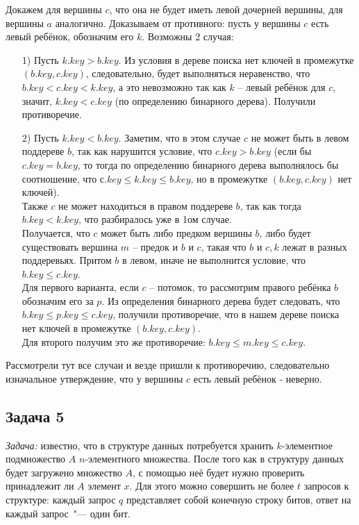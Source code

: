 \documentclass[a4paper,12pt]{article} %
\begin{document}
Докажем для вершины $ c $, что она не будет иметь левой дочерней вершины, для вершины $ a $ аналогично. Доказываем от противного: пусть у вершины $ c $ есть левый ребёнок, обозначим его $ k $. Возможны 2 случая:
\begin{itemize}
\item[1) ] Пусть $ k.key > b.key $. Из условия в дереве поиска нет ключей в промежутке $(b.key,c.key)$, следовательно, будет выполняться неравенство, что $ b.key < c.key < k.key $, а это невозможно так как $ k $ -- левый ребёнок для $ c $, значит, $ k.key < c.key $ (по определению бинарного дерева). Получили противоречие.
\item[2) ] Пусть $ k.key < b.key $. Заметим, что в этом случае $ c $ не может быть в левом поддереве $ b $, так как нарушится условие, что $ c.key > b.key $ (если бы $ c.key = b.key $, то тогда по определению бинарного дерева выполнялось бы соотношение, что $ с.key \leq k.key \leq b.key $, но в промежутке $(b.key,c.key)$ нет ключей).\\
Также $ c $ не может находиться в правом поддереве $ b $, так как тогда $ b.key < k.key $, что разбиралось уже в 1ом случае.\\
Получается, что $ c $ может быть либо предком вершины $ b $, либо будет существовать вершина $ m $ -- предок и $ b $ и $ c $, такая что $ b $ и $ c, k $ лежат в разных поддеревьях. Притом $ b $ в левом, иначе не выполнится условие, что $ b.key \leq c.key $. \\
Для первого варианта, если $ c $ -- потомок, то рассмотрим правого ребёнка $ b $ обозначим его за $ p $. Из определения бинарного дерева будет следовать, что $ b.key \leq p.key \leq c.key $, получили противоречие, что в нашем дереве поиска нет ключей в промежутке $(b.key,c.key)$.\\
Для второго получим это же противоречие: $ b.key \leq m.key \leq c.key $. 
\end{itemize}
Рассмотрели тут все случаи и везде пришли к противоречию, следовательно изначальное утверждение, что у вершины $ c $ есть левый ребёнок - неверно.


\subsection*{Задача 5}
\textit{Задача:} известно, что в структуре данных потребуется хранить $k$-элементное подмножество $A$ $n$-элементного множества. После того как в структуру данных будет загружено множество $A$, с помощью неё будет нужно проверить принадлежит ли $A$ элемент $x$. Для этого можно совершить не более $t$ запросов к структуре: каждый запрос $q$ представляет собой конечную строку битов, ответ на каждый запрос~"--- один бит. 
\end{document}

